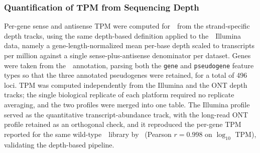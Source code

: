 \subsubsection{Quantification of TPM from Sequencing Depth}

Per-gene sense and antisense TPM were computed for~\syna~from the strand-specific depth tracks, using the same depth-based definition applied to the~\syn~Illumina data, namely a gene-length-normalized mean per-base depth scaled to transcripts per million against a single sense-plus-antisense denominator per dataset.
Genes were taken from the~\syna~annotation, parsing both the \texttt{gene} and \texttt{pseudogene} feature types so that the three annotated pseudogenes were retained, for a total of 496 loci.
TPM was computed independently from the Illumina and the ONT depth tracks; the single biological replicate of each platform required no replicate averaging, and the two profiles were merged into one table.
The Illumina profile served as the quantitative transcript-abundance track, with the long-read ONT profile retained as an orthogonal check, and it reproduced the per-gene TPM reported for the same wild-type~\syna~library by~\cite{sandberg_adaptive_2023} (Pearson $r = 0.998$ on $\log_{10}$ TPM), validating the depth-based pipeline.
